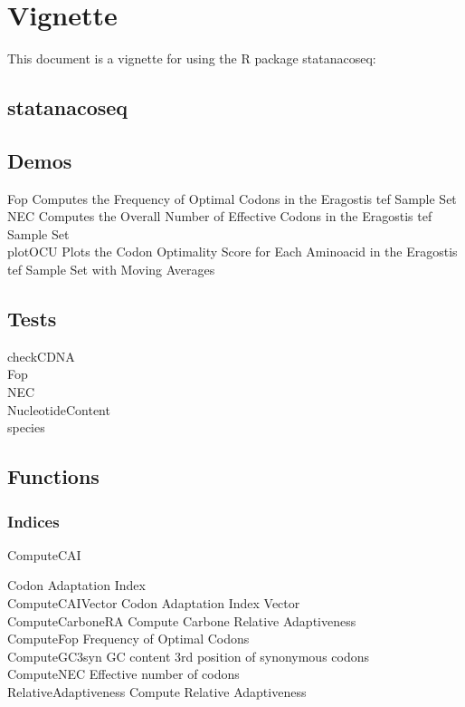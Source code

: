 \chapter{Vignette}
This document is a vignette for using the R package statanacoseq:


\section{statanacoseq}


\section{Demos}
Fop \quad Computes the Frequency of Optimal Codons in the Eragostis tef Sample Set \\
NEC \quad Computes the Overall Number of Effective Codons in the Eragostis tef Sample Set \\
plotOCU \quad Plots the Codon Optimality Score for Each Aminoacid in the Eragostis tef Sample Set with Moving Averages \\


\section{Tests}
checkCDNA \quad \\
Fop \quad \\
NEC \quad \\
NucleotideContent \quad \\
species \quad \\

\section{Functions}

\subsection{Indices}
\hypertarget{function:CAI}{ComputeCAI}	\quad Codon Adaptation Index \\
\hypertarget{function:CAIv}{ComputeCAIVector} \quad 	Codon Adaptation Index Vector \\
\hypertarget{function:RA}{ComputeCarboneRA}	\quad Compute Carbone Relative Adaptiveness \\
\hypertarget{function:Fop}{ComputeFop}	\quad Frequency of Optimal Codons \\
\hypertarget{function:G3C}{ComputeGC3syn}	\quad GC content 3rd position of synonymous codons	 \\	%
\hypertarget{function:NEC}{ComputeNEC}	\quad Effective number of codons \\							%
\hypertarget{function:RA}{RelativeAdaptiveness}	\quad Compute Relative Adaptiveness	 \\			%


